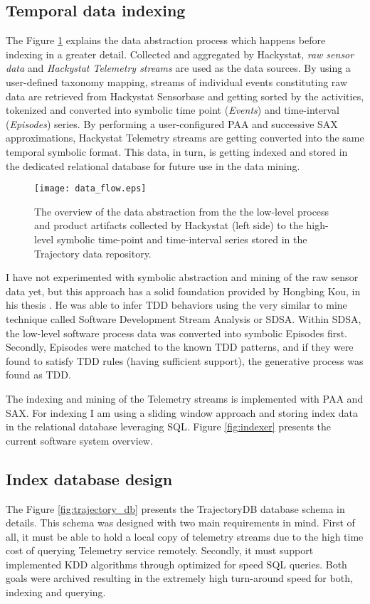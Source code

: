\subsection{Temporal data indexing}
The Figure \ref{fig:data_flow} explains the data abstraction process which happens before indexing in a greater detail. Collected and aggregated by Hackystat, \textit{raw sensor data} and \textit{Hackystat Telemetry streams} are used as the data sources. By using a user-defined taxonomy mapping, streams of individual events constituting raw data are retrieved from Hackystat Sensorbase and getting sorted by the activities, tokenized and converted into symbolic time point (\textit{Events}) and time-interval (\textit{Episodes}) series. By performing a user-configured PAA and successive SAX approximations, Hackystat Telemetry streams are getting converted into the same temporal symbolic format. This data, in turn, is getting indexed and stored in the dedicated relational database for future use in the data mining.

\begin{figure}[tbp]
   \centering
   \texttt{[image: data\_flow.eps]}
   \caption{The overview of the data abstraction from the the low-level process and product artifacts collected by Hackystat (left side) to the high-level symbolic time-point and time-interval series stored in the Trajectory data repository.}
   \label{fig:data_flow}
\end{figure}

I have not experimented with symbolic abstraction and mining of the raw sensor data yet, but this approach has a solid foundation provided by Hongbing Kou, in his thesis \cite{citeulike:2703162}. He was able to infer TDD behaviors using the very similar to mine technique called Software Development Stream Analysis or SDSA. Within SDSA, the low-level software process data was converted into symbolic Episodes first. Secondly, Episodes were matched to the known TDD patterns, and if they were found to satisfy TDD rules (having sufficient support), the generative process was found as TDD.

The indexing and mining of the Telemetry streams is implemented with PAA and SAX. For indexing I am using a sliding window approach and storing index data in the relational database leveraging SQL. Figure \ref{fig:indexer} presents the current software system overview.

\subsection{Index database design}
The Figure \ref{fig:trajectory_db} presents the TrajectoryDB database schema in details. This schema was designed with two main requirements in mind. First of all, it must be able to hold a local copy of telemetry streams due to the high time cost of querying Telemetry service remotely. Secondly, it must support implemented KDD algorithms through optimized for speed SQL queries. Both goals were archived resulting in the extremely high turn-around speed for both, indexing and querying.

